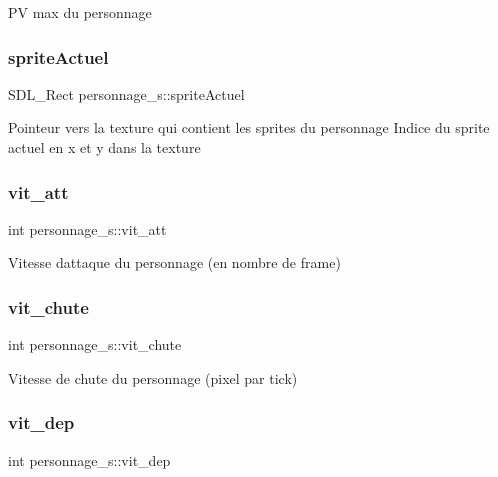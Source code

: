 PV max du personnage \mbox{\label{structpersonnage__s_afa75822afebdaf61725b7f87c86d5922}} 
\subsubsection{\texorpdfstring{sprite\+Actuel}{spriteActuel}}
{\footnotesize\ttfamily S\+D\+L\+\_\+\+Rect personnage\+\_\+s\+::sprite\+Actuel}

Pointeur vers la texture qui contient les sprites du personnage Indice du sprite actuel en x et y dans la texture \mbox{\label{structpersonnage__s_a0022973bab638a02774a19710cedcd17}} 
\subsubsection{\texorpdfstring{vit\+\_\+att}{vit\_att}}
{\footnotesize\ttfamily int personnage\+\_\+s\+::vit\+\_\+att}

Vitesse d\textquotesingle{}attaque du personnage (en nombre de frame) \mbox{\label{structpersonnage__s_a8e340f828bfffa2c47269e315609ed01}} 
\subsubsection{\texorpdfstring{vit\+\_\+chute}{vit\_chute}}
{\footnotesize\ttfamily int personnage\+\_\+s\+::vit\+\_\+chute}

Vitesse de chute du personnage (pixel par tick) \mbox{\label{structpersonnage__s_a6899a0efdc3a3fccb060aaf06b4e4b8d}} 
\subsubsection{\texorpdfstring{vit\+\_\+dep}{vit\_dep}}
{\footnotesize\ttfamily int personnage\+\_\+s\+::vit\+\_\+dep}

